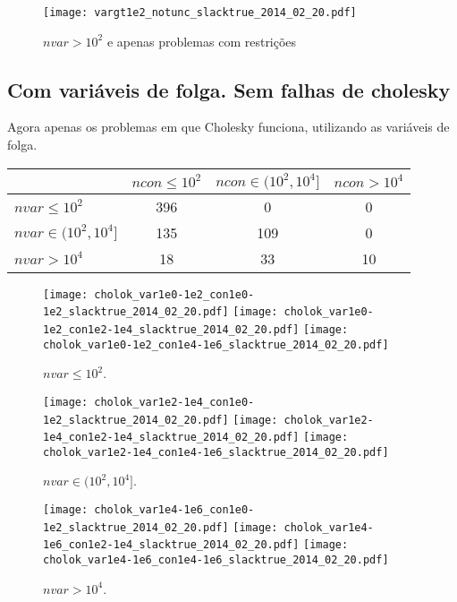 \documentclass{article}
\begin{document}
\begin{figure}[H]
\centering
\texttt{[image: vargt1e2\_notunc\_slacktrue\_2014\_02\_20.pdf]}
\caption{ $nvar > 10^2$ e apenas problemas com restrições }
\label{fig:nvar_medium_and_big_not_unc}
\end{figure}

\newpage
\subsection{Com variáveis de folga. Sem falhas de cholesky}

Agora apenas os problemas em que Cholesky funciona, utilizando as variáveis de
folga.
\begin{center}
\begin{tabular}{|l|c|c|c|} \hline
& $ncon \leq 10^2$ & $ncon \in (10^2,10^4]$ & $ncon > 10^4$ \\ \hline
$nvar \leq 10^2$       & 396 &   0 &  0 \\ \hline
$nvar \in (10^2,10^4]$ & 135 & 109 &  0 \\ \hline
$nvar > 10^4$          &  18 &  33 & 10 \\ \hline
\end{tabular}
\end{center}

\begin{figure}[H]
\centering
\texttt{[image: cholok\_var1e0-1e2\_con1e0-1e2\_slacktrue\_2014\_02\_20.pdf]}
\texttt{[image: cholok\_var1e0-1e2\_con1e2-1e4\_slacktrue\_2014\_02\_20.pdf]}
\texttt{[image: cholok\_var1e0-1e2\_con1e4-1e6\_slacktrue\_2014\_02\_20.pdf]}
\caption{ $nvar \leq 10^2$. }
\label{fig:nvar_small}
\end{figure}
\begin{figure}[H]
\centering
\texttt{[image: cholok\_var1e2-1e4\_con1e0-1e2\_slacktrue\_2014\_02\_20.pdf]}
\texttt{[image: cholok\_var1e2-1e4\_con1e2-1e4\_slacktrue\_2014\_02\_20.pdf]}
\texttt{[image: cholok\_var1e2-1e4\_con1e4-1e6\_slacktrue\_2014\_02\_20.pdf]}
\caption{ $nvar \in (10^2,10^4]$. }
\label{fig:nvar_medium}
\end{figure}
\begin{figure}[H]
\centering
\texttt{[image: cholok\_var1e4-1e6\_con1e0-1e2\_slacktrue\_2014\_02\_20.pdf]}
\texttt{[image: cholok\_var1e4-1e6\_con1e2-1e4\_slacktrue\_2014\_02\_20.pdf]}
\texttt{[image: cholok\_var1e4-1e6\_con1e4-1e6\_slacktrue\_2014\_02\_20.pdf]}
\caption{ $nvar > 10^4$. }
\label{fig:nvar_big}
\end{figure}
\end{document}
